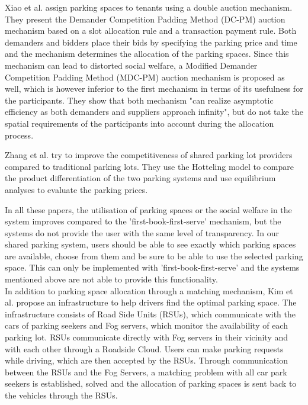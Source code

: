 Xiao et al. \cite{xiao2018shared} assign parking spaces to tenants using a double auction mechanism. They present the Demander Competition Padding Method (DC-PM) auction mechanism based on a slot allocation rule and a transaction payment rule. Both demanders and bidders place their bids by specifying the parking price and time and the mechanism determines the allocation of the parking spaces. Since this mechanism can lead to distorted social welfare, a Modified Demander Competition Padding Method (MDC-PM) auction mechanism is proposed as well, which is however inferior to the first mechanism in terms of its usefulness for the participants. They show that both mechanism "can realize asymptotic efficiency as both demanders and suppliers approach infinity", but do not take the spatial requirements of the participants into account during the allocation process. 

Zhang et al. \cite{zhang2019pricing} try to improve the competitiveness of shared parking lot providers compared to traditional parking lots. They use the Hotteling model to compare the product differentiation of the two parking systems and use equilibrium analyses to evaluate the parking prices. 

In all these papers, the utilisation of parking spaces or the social welfare in the system improves compared to the 'first-book-first-serve' mechanism, but the systems do not provide the user with the same level of transparency. In our shared parking system, users should be able to see exactly which parking spaces are available, choose from them and be sure to be able to use the selected parking space. This can only be implemented with 'first-book-first-serve' and the systems mentioned above are not able to provide this functionality.\\

In addition to parking space allocation through a matching mechanism, Kim et al. \cite{Kim2015ASP} propose an infrastructure to help drivers find the optimal parking space. The infrastructure consists of Road Side Units (RSUs), which communicate with the cars of parking seekers and Fog servers, which monitor the availability of each parking lot. RSUs communicate directly with Fog servers in their vicinity and with each other through a Roadside Cloud. Users can make parking requests while driving, which are then accepted by the RSUs. Through communication between the RSUs and the Fog Servers, a matching problem with all car park seekers is established, solved and the allocation of parking spaces is sent back to the vehicles through the RSUs. 

